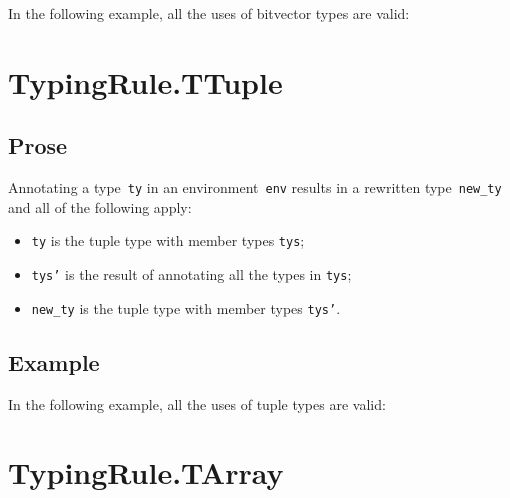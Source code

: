 \documentclass{book}
\begin{document}
\begin{itemize}
In the following example, all the uses of bitvector types are valid:




\section{TypingRule.TTuple \label{sec:TypingRule.TTuple}}

\subsection{Prose}
Annotating a type~\texttt{ty} in an environment~\texttt{env} results in a
rewritten type~\texttt{new\_ty} and all of the following apply:
\begin{itemize}
  \item \texttt{ty} is the tuple type with member types \texttt{tys};
  \item \texttt{tys'} is the result of annotating all the types in
    \texttt{tys};
  \item \texttt{new\_ty} is the tuple type with member types \texttt{tys'}.
\end{itemize}

\subsection{Example}
In the following example, all the uses of tuple types are valid:







\section{TypingRule.TArray \label{sec:TypingRule.TArray}}


\end{itemize}
\end{document}
